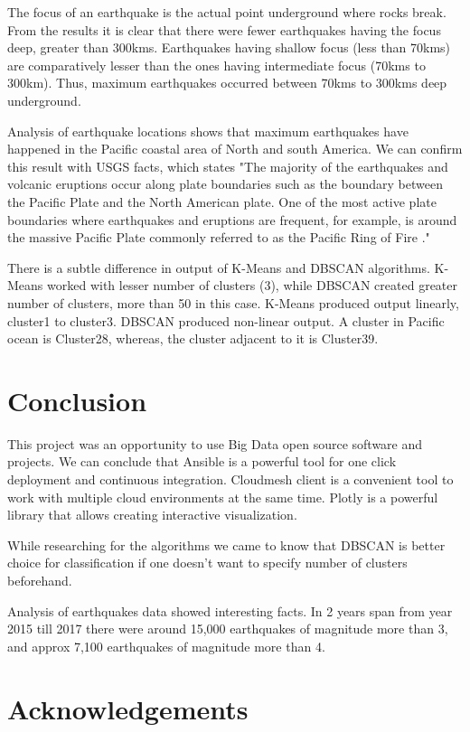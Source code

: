 \documentclass[9pt,twocolumn,twoside]{../../styles/osajnl}
\begin{document}
The focus of an earthquake is the actual point underground where rocks break. From the results it is clear that there were fewer earthquakes having the focus deep, greater than 300kms. Earthquakes having shallow focus (less than 70kms) are comparatively lesser than the ones having intermediate focus (70kms to 300km). Thus, maximum earthquakes occurred between 70kms to 300kms deep underground.

Analysis of earthquake locations shows that maximum earthquakes have happened in the Pacific coastal area of North and south America. We can confirm this result with USGS facts, which states "The majority of the earthquakes and volcanic eruptions occur along plate boundaries such as the boundary between the Pacific Plate and the North American plate. One of the most active plate boundaries where earthquakes and eruptions are frequent, for example, is around the massive Pacific Plate commonly referred to as the Pacific Ring of Fire \cite{www-usgs4}."

There is a subtle difference in output of K-Means and DBSCAN algorithms. K-Means worked with lesser number of clusters (3), while DBSCAN created greater number of clusters, more than 50 in this case. K-Means produced output linearly, cluster1 to cluster3. DBSCAN produced non-linear output. A cluster in Pacific ocean is Cluster28, whereas, the cluster adjacent to it is Cluster39.  


\section {Conclusion}
This project was an opportunity to use Big Data open source software and projects. 
We can conclude that Ansible is a powerful tool for one click deployment and continuous integration. Cloudmesh client is a convenient tool to work with multiple cloud environments at the same time. Plotly is a powerful library that allows creating interactive visualization. 

While researching for the algorithms we came to know that DBSCAN is better choice for classification if one doesn't want to specify number of clusters beforehand.

Analysis of earthquakes data showed interesting facts. In 2 years span from year 2015 till 2017 there were around 15,000 earthquakes of magnitude more than 3, and approx 7,100 earthquakes of magnitude more than 4.

\section {Acknowledgements}
\end{document}
